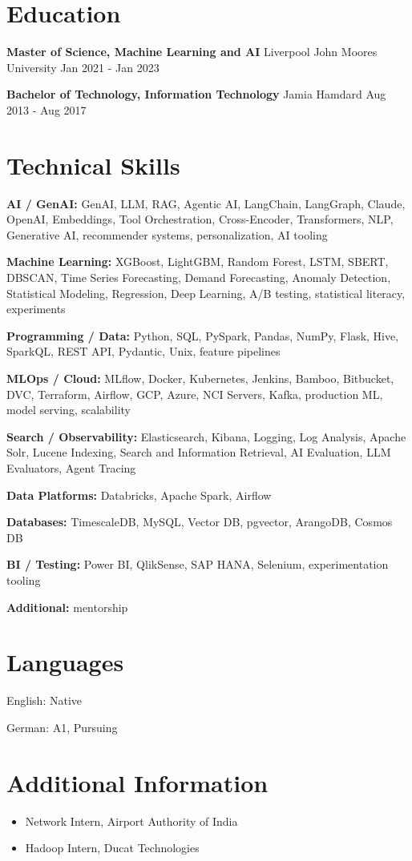 \documentclass[10pt,a4paper]{article}
\begin{document}
\section{Education}
\textbf{Master of Science, Machine Learning and AI} \textbar{} Liverpool John Moores University \hfill Jan 2021 - Jan 2023\par
\textbf{Bachelor of Technology, Information Technology} \textbar{} Jamia Hamdard \hfill Aug 2013 - Aug 2017\par

\section{Technical Skills}
\textbf{AI / GenAI:} GenAI, LLM, RAG, Agentic AI, LangChain, LangGraph, Claude, OpenAI, Embeddings, Tool Orchestration, Cross-Encoder, Transformers, NLP, Generative AI, recommender systems, personalization, AI tooling\par
\textbf{Machine Learning:} XGBoost, LightGBM, Random Forest, LSTM, SBERT, DBSCAN, Time Series Forecasting, Demand Forecasting, Anomaly Detection, Statistical Modeling, Regression, Deep Learning, A/B testing, statistical literacy, experiments\par
\textbf{Programming / Data:} Python, SQL, PySpark, Pandas, NumPy, Flask, Hive, SparkQL, REST API, Pydantic, Unix, feature pipelines\par
\textbf{MLOps / Cloud:} MLflow, Docker, Kubernetes, Jenkins, Bamboo, Bitbucket, DVC, Terraform, Airflow, GCP, Azure, NCI Servers, Kafka, production ML, model serving, scalability\par
\textbf{Search / Observability:} Elasticsearch, Kibana, Logging, Log Analysis, Apache Solr, Lucene Indexing, Search and Information Retrieval, AI Evaluation, LLM Evaluators, Agent Tracing\par
\textbf{Data Platforms:} Databricks, Apache Spark, Airflow\par
\textbf{Databases:} TimescaleDB, MySQL, Vector DB, pgvector, ArangoDB, Cosmos DB\par
\textbf{BI / Testing:} Power BI, QlikSense, SAP HANA, Selenium, experimentation tooling\par
\textbf{Additional:} mentorship\par

\section{Languages}
English: Native\par
German: A1, Pursuing\par

\section{Additional Information}
\begin{itemize}
  \item Network Intern, Airport Authority of India
  \item Hadoop Intern, Ducat Technologies
\end{itemize}
\end{document}
